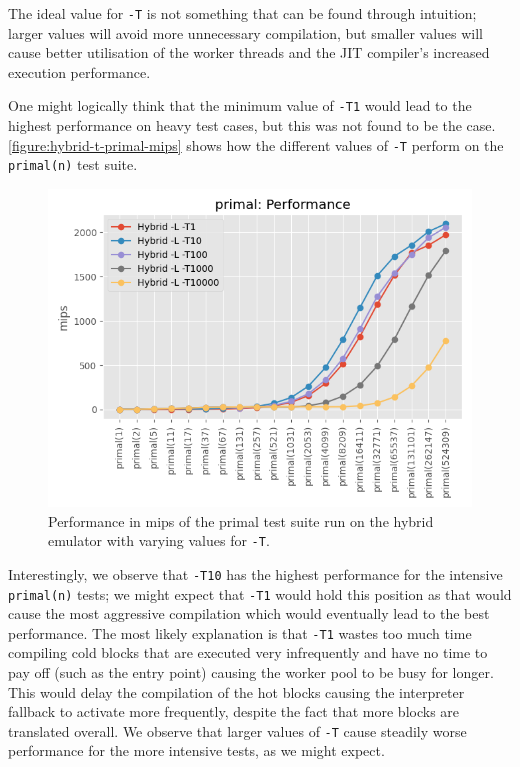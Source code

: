 The ideal value for \texttt{-T} is not something that can be found through intuition; larger values will avoid more unnecessary compilation, but smaller values will cause better utilisation of the worker threads and the JIT compiler's increased execution performance.

One might logically think that the minimum value of \texttt{-T1} would lead to the highest performance on heavy test cases, but this was not found to be the case. \autoref{figure:hybrid-t-primal-mips} shows how the different values of \texttt{-T} perform on the \texttt{primal(n)} test suite.

\begin{figure}[H]
    \centering
    \includegraphics[scale=0.75]{output/graphs/tests/hybrid_t/primal/mips.png}
    \caption{Performance in mips of the primal test suite run on the hybrid emulator with varying values for \texttt{-T}.}
    \label{figure:hybrid-t-primal-mips}
\end{figure}

Interestingly, we observe that \texttt{-T10} has the highest performance for the intensive \texttt{primal(n)} tests; we might expect that \texttt{-T1} would hold this position as that would cause the most aggressive compilation which would eventually lead to the best performance. The most likely explanation is that \texttt{-T1} wastes too much time compiling cold blocks that are executed very infrequently and have no time to pay off (such as the entry point) causing the worker pool to be busy for longer. This would delay the compilation of the hot blocks causing the interpreter fallback to activate more frequently, despite the fact that more blocks are translated overall. We observe that larger values of \texttt{-T} cause steadily worse performance for the more intensive tests, as we might expect.

